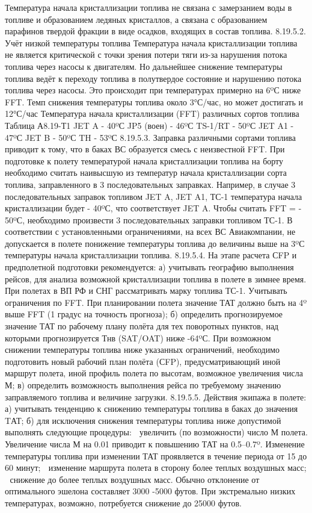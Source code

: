 Температура начала кристаллизации топлива не связана с замерзанием воды в топливе и образованием ледяных кристаллов, а связана с образованием парафинов твердой фракции в виде осадков, входящих в состав топлива.
8.19.5.2. Учёт низкой температуры топлива Температура начала кристаллизации топлива не является критической с точки зрения потери тяги из-за нарушения потока топлива через насосы к двигателям. Но дальнейшее снижение температуры топлива ведёт к переходу топлива в полутвердое состояние и нарушению потока топлива через насосы. Это происходит при температурах примерно на 6ºС ниже FFT.
Темп снижения температуры топлива около 3°С/час, но может достигать и 12°С/час 
Температура начала кристаллизации (FFT) различных сортов топлива
                                                                                                                             Таблица А8.19-Т1
                 JET A	- 40ºС		JP5 (воен)	- 46ºС		TS-1/RT	- 50ºС
                 JET A1	- 47ºС		JET B	- 50ºС		TH	- 53ºС
8.19.5.3. Заправка различными сортами топлива приводит к тому, что в баках ВС образуется смесь с неизвестной FFT. При подготовке к полету температурой начала кристаллизации топлива на борту необходимо считать наивысшую из температур начала кристаллизации сорта топлива, заправленного в 3 последовательных заправках.
Например, в случае 3 последовательных заправок топливом JET A, JET A1, ТС-1 температура начала кристаллизации будет - 40ºС, что соответствует JET A. Чтобы считать FFT = - 50ºС, необходимо произвести 3 последовательных заправки топливом ТС-1. В соответствии с установленными ограничениями, на всех ВС Авиакомпании, не допускается в полете понижение температуры топлива до величины выше на 3ºС температуры начала кристаллизации топлива.
8.19.5.4. На этапе расчета СFP и предполетной подготовки рекомендуется:
а)	учитывать географию выполнения рейсов, для анализа возможной кристаллизации топлива в полете в зимнее время. При полетах в ВП РФ и СНГ рассматривать марку топлива ТС-1. Учитывать ограничения по FFT. При планировании полета значение ТАТ должно быть на 4º выше FFT (1 градус на точность прогноза);
б)	определить прогнозируемое значение ТАТ по рабочему плану полёта для тех поворотных пунктов, над которыми прогнозируется Тнв (SAT/OAT) ниже -64ºС. При возможном снижении температуры топлива ниже указанных ограничений, необходимо подготовить новый рабочий план полёта (СFP), предусматривающий иной маршрут полета, иной профиль полета по высотам, возможное увеличения числа М;
в)	определить возможность выполнения рейса по требуемому значению заправляемого топлива и величине загрузки.
8.19.5.5. Действия экипажа в полете:
а)	учитывать тенденцию к снижению температуры топлива в баках до значения TАТ;
б)	для исключения снижения температуры топлива ниже допустимой выполнять следующие процедуры:
	увеличить (по возможности) число М полета. Увеличение числа М на 0.01 приводит к повышению ТАТ на 0.5–0.7º. Изменение температуры топлива при изменении ТАТ проявляется в течение периода от 15 до 60 минут;
	изменение маршрута полета в сторону более теплых воздушных масс;
	снижение до более теплых воздушных масс. Обычно отклонение от оптимального эшелона составляет 3000 -5000 футов. При экстремально низких температурах, возможно, потребуется снижение до 25000 футов.
